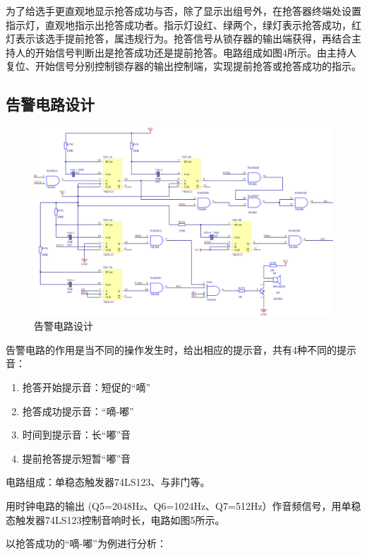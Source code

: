 \documentclass{../source/Experiment}
\begin{document}
            为了给选手更直观地显示抢答成功与否，除了显示出组号外，在抢答器终端处设置指示灯，直观地指示出抢答成功者。指示灯设红、绿两个，绿灯表示抢答成功，红灯表示该选手提前抢答，属违规行为。抢答信号从锁存器的输出端获得，再结合主持人的开始信号判断出是抢答成功还是提前抢答。电路组成如图4所示。由主持人复位、开始信号分别控制锁存器的输出控制端，实现提前抢答或抢答成功的指示。

        \subsection{告警电路设计}
            \begin{figure}[H]
                \centering
                \includegraphics[width = 1\textwidth]{pic/P03.png}
                \caption{告警电路设计}
            \end{figure}

        告警电路的作用是当不同的操作发生时，给出相应的提示音，共有4种不同的提示音：
        \begin{enumerate}
            \item 抢答开始提示音：短促的“嘀”
            \item 抢答成功提示音：“嘀-嘟”
            \item 时间到提示音：长“嘟”音
            \item 提前抢答提示短暂“嘟”音
        \end{enumerate}
        
        电路组成：单稳态触发器74LS123、与非门等。

        用时钟电路的输出 (Q5=2048Hz、Q6=1024Hz、Q7=512Hz）作音频信号，用单稳态触发器74LS123控制音响时长，电路如图5所示。

        以抢答成功的“嘀-嘟”为例进行分析：
\end{document}
